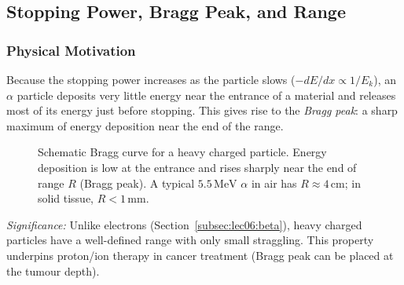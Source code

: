\subsection{Stopping Power, Bragg Peak, and Range}
\label{subsec:lec06:bragg}

\subsubsection*{Physical Motivation}
Because the stopping power increases as the particle slows ($-dE/dx \propto
1/E_k$), an $\alpha$ particle deposits very little energy near the entrance of a
material and releases most of its energy just before stopping.  This gives rise
to the \emph{Bragg peak}: a sharp maximum of energy deposition near the end of
the range.

\begin{figure}[h]
\centering
{}
\caption{Schematic Bragg curve for a heavy charged particle.  Energy deposition
is low at the entrance and rises sharply near the end of range $R$ (Bragg peak).
A typical $5.5\,\text{MeV}$ $\alpha$ in air has $R \approx 4\,\text{cm}$; in
solid tissue, $R < 1\,\text{mm}$.}
\label{fig:lec06:bragg}
\end{figure}


\textit{Significance:} Unlike electrons (Section~\ref{subsec:lec06:beta}), heavy charged
particles have a well-defined range with only small straggling.  This
property underpins proton/ion therapy in cancer treatment (Bragg peak can
be placed at the tumour depth).

